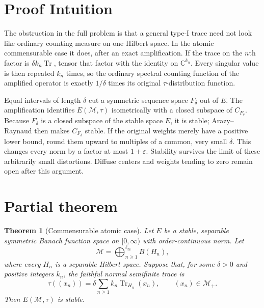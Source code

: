 \documentclass[11pt]{amsart}
\newtheorem{theorem}{Theorem}
\newcommand{\M}{\mathcal M}
\newcommand{\Tr}{\operatorname{Tr}}
\begin{document}
\section*{Proof Intuition}

The obstruction in the full problem is that a general type-I trace need not
look like ordinary counting measure on one Hilbert space.  In the atomic
commensurable case it does, after an exact amplification.  If the trace on the
$n$th factor is $\delta k_n\Tr$, tensor that factor with the identity on
$\mathbb C^{k_n}$.  Every singular value is then repeated $k_n$ times, so the
ordinary spectral counting function of the amplified operator is exactly
$1/\delta$ times its original $\tau$-distribution function.

Equal intervals of length $\delta$ cut a symmetric sequence space $F_\delta$
out of $E$.  The amplification identifies $E(\M,\tau)$ isometrically with a
closed subspace of $C_{F_\delta}$.  Because $F_\delta$ is a closed subspace of
the stable space $E$, it is stable; Arazy--Raynaud then makes
$C_{F_\delta}$ stable.  If the original weights merely have a positive lower
bound, round them upward to multiples of a common, very small $\delta$.  This
changes every norm by a factor at most $1+\varepsilon$.  Stability survives the
limit of these arbitrarily small distortions.  Diffuse centers and weights
tending to zero remain open after this argument.

\newpage
\section*{Partial theorem}

\begin{theorem}[Commensurable atomic case]\label{thm:commensurable}
Let $E$ be a stable, separable symmetric Banach function space on
$[0,\infty)$ with order-continuous norm.  Let
\[
 \M=\mathop{\bigoplus}^{\ell_\infty}_{n\geq1}B(H_n),
\]
where every $H_n$ is a separable Hilbert space.  Suppose that, for some
$\delta>0$ and positive integers $k_n$, the faithful normal semifinite trace
is
\[
 \tau((x_n))=\delta\sum_{n\geq1}k_n\Tr_{H_n}(x_n),
 \qquad (x_n)\in\M_+.
\]
Then $E(\M,\tau)$ is stable.
\end{theorem}
\end{document}
